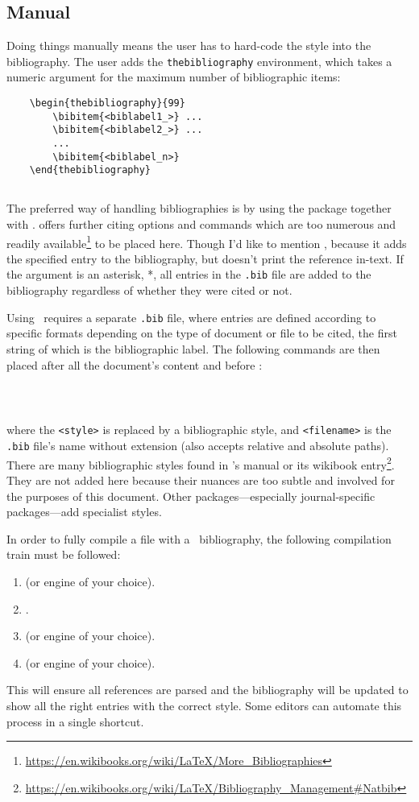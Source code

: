 \subsection{Manual}
%
Doing things manually means the user has to hard-code the style into
the bibliography.  The user adds the \verb|thebibliography|
environment, which takes a numeric argument for the maximum number of
bibliographic items:
\begin{verbatim}
	\begin{thebibliography}{99}
	    \bibitem{<biblabel1_>} ...
	    \bibitem{<biblabel2_>} ...
	    ...
	    \bibitem{<biblabel_n>}
	\end{thebibliography}
\end{verbatim}
%
\subsection{\BibTeX}\label{sb:bib}
%
The preferred way of handling bibliographies is by using the
 package together with \BibTeX.   offers
further citing options and commands which are too numerous and readily
available\footnote{\url{https://en.wikibooks.org/wiki/LaTeX/More_Bibliographies}}
to be placed here.  Though I'd like to mention ,
because it adds the specified entry to the bibliography, but doesn't
print the reference in-text.  If the argument is an asterisk, *, all
entries in the \verb|.bib| file are added to the bibliography
regardless of whether they were cited or not.

Using \BibTeX~requires a separate \verb|.bib| file, where entries are
defined according to specific formats depending on the type of
document or file to be cited, the first string of which is the
bibliographic label.  The following commands are then placed after all
the document's content and before :
\begin{verbatim}
	
	
\end{verbatim}
where the \verb|<style>| is replaced by a bibliographic style, and
\verb|<filename>| is the \verb|.bib| file's name without extension
(also accepts relative and absolute paths).  There are many
bibliographic styles found in 's manual or its wikibook
entry\footnote{\url{https://en.wikibooks.org/wiki/LaTeX/Bibliography_Management\#Natbib}}. They
are not added here because their nuances are too subtle and involved
for the purposes of this document.  Other packages---especially
journal-specific packages---add specialist styles.

In order to fully compile a file with a \BibTeX~bibliography, the
following compilation train must be followed:
\begin{enumerate}
\item \XeLaTeX (or engine of your choice).
\item \BibTeX.
\item \XeLaTeX (or engine of your choice).
\item \XeLaTeX (or engine of your choice).
\end{enumerate}
This will ensure all references are parsed and the bibliography will
be updated to show all the right entries with the correct style.  Some
editors can automate this process in a single shortcut.
%
